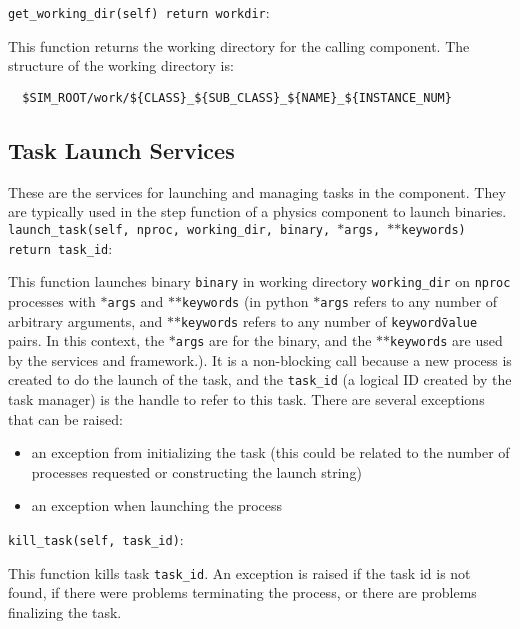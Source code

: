 \texttt{get\_working\_dir(self) return workdir}:
\par
  This function returns the working directory for the calling component.  
  The structure of the working directory is:
  \begin{verbatim}
  $SIM_ROOT/work/${CLASS}_${SUB_CLASS}_${NAME}_${INSTANCE_NUM}
  \end{verbatim}

\subsection{Task Launch Services}
\label{sec:task_services}
\par These are the services for launching and managing tasks in the component.  
They are typically used in the step function of a physics component to 
launch binaries.\\

\texttt{launch\_task(self, nproc, working\_dir, binary, $\ast$args, $\ast$$\ast$keywords) return task\_id}:
\par
  This function launches binary \texttt{binary} in working directory 
  \texttt{working\_dir} on \texttt{nproc} processes with \texttt{$\ast$args} and \texttt{$\ast$$\ast$keywords} (in 
  python \texttt{$\ast$args} refers to any number of arbitrary arguments, and \texttt{$\ast$$\ast$keywords} 
  refers to any number of \texttt{keyword\=value} pairs.  In this context, the \texttt{$\ast$args} 
  are for the binary, and the \texttt{$\ast$$\ast$keywords} are used by the services and 
  framework.).  It is a non-blocking call because a new process is created 
  to do the launch of the task, and the \texttt{task\_id} (a logical ID created by 
  the task manager) is the handle to refer to this task.  There are 
  several exceptions that can be raised:
  \begin{itemize}
    \item an exception from initializing the task (this could be related to 
      the number of processes requested or constructing the launch string)
    \item an exception when launching the process
  \end{itemize}
  
\texttt{kill\_task(self, task\_id)}:
\par
  This function kills task \texttt{task\_id}.  An exception is raised if the task 
  id is not found, if there were problems terminating the process, or 
  there are problems finalizing the task.\\

